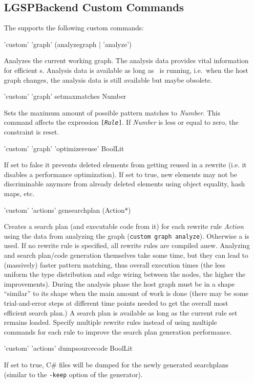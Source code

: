 \subsection{LGSPBackend Custom Commands}
\label{custom}


The  supports the following custom commands:

\begin{rail}
  'custom' 'graph' (analyzegraph | 'analyze') 
\end{rail}
Analyzes the current working graph.
The analysis data provides vital information for efficient s.
Analysis data is available as long as \GrShell\ is running, i.e.\ when the host graph changes, the analysis data is still available but maybe obsolete.

\begin{rail}
  'custom' 'graph' setmaxmatches Number
\end{rail}
Sets the maximum amount of possible pattern matches to \emph{Number}.
This command affects the expression \texttt{[\emph{Rule}]}.
If \emph{Number} is less or equal to zero, the constraint is reset.

\begin{rail}
  'custom' 'graph' 'optimizereuse' BoolLit
\end{rail}
If set to false it prevents deleted elements from getting reused in a rewrite (i.e. it disables a performance optimization).
If set to true, new elements may not be discriminable anymore from already deleted elements using object equality, hash maps, etc.
					
\begin{rail}
  'custom' 'actions' gensearchplan (Action*)
\end{rail}
Creates a search plan (and executable code from it) for each rewrite rule \emph{Action} using the data from analyzing the graph (\texttt{custom graph analyze}).
Otherwise a  is used. 
If no rewrite rule is specified, all rewrite rules are compiled anew.
Analyzing and search plan/code generation themselves take some time, but they can lead to (massively) faster pattern matching, thus overall execution times
(the less uniform the type distribution and edge wiring between the nodes, the higher the improvements).
During the analysis phase the host graph must be in a shape ``similar'' to its shape when the main amount of work is done
(there may be some trial-and-error steps at different time points needed to get the overall most efficient search plan.)
A search plan is available as long as the current rule set remains loaded. 
Specify multiple rewrite rules instead of using multiple commands for each rule to improve the search plan generation performance.

\begin{rail}
  'custom' 'actions' dumpsourcecode BoolLit
\end{rail}
If set to true, C\# files will be dumped for the newly generated searchplans (similar to the \texttt{-keep} option of the generator).

